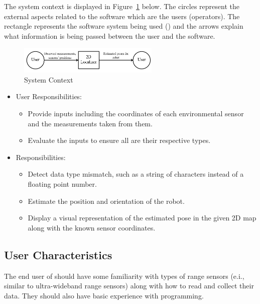 \documentclass[12pt]{article}
\begin{document}
The system context is displayed in Figure~\ref{Fig_SystemContext} below. The circles represent the external aspects related to the software which are the users (operators). The rectangle represents the software system being used (\progname) and the arrows explain what information is being passed between the user and the software.

\begin{figure}[h!]
\begin{center}
 \includegraphics[width=0.6\textwidth]{SystemContextFigure.png}
\caption{System Context}
\label{Fig_SystemContext} 
\end{center}
\end{figure}
\begin{itemize}
\item User Responsibilities:
\begin{itemize}
\item Provide inputs including the coordinates of each environmental sensor and the measurements taken from them.
\item Evaluate the inputs to ensure all are their respective types.
\end{itemize}
\item \progname Responsibilities:
\begin{itemize} 
\item Detect data type mismatch, such as a string of characters instead of a
  floating point number.
\item Estimate the position and orientation of the robot.
\item Display a visual representation of the estimated pose in the given 2D map along with the known sensor coordinates.
\end{itemize}
\end{itemize}

\subsection{User Characteristics}\label{SecUserCharacteristics}

The end user of \progname should have some familiarity with types of range sensors (e.i., similar to ultra-wideband range sensors) along with how to read and collect their data. They should also have basic experience with programming.
\end{document}
